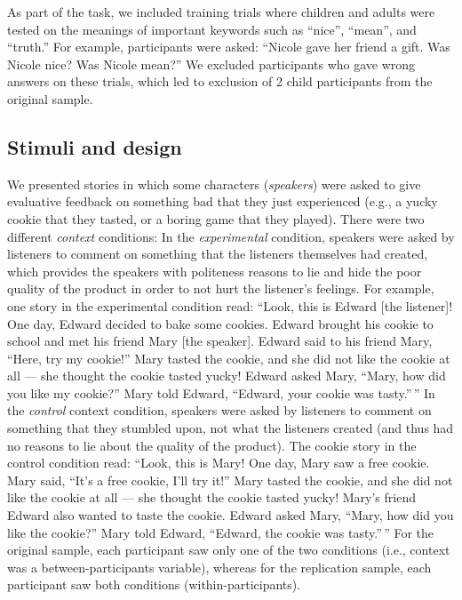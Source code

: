 \documentclass[oneside]{report}
\begin{document}
As part of the task, we included training trials where children and
adults were tested on the meanings of important keywords such as
``nice'', ``mean'', and ``truth.'' For example, participants were asked:
``Nicole gave her friend a gift. Was Nicole nice? Was Nicole mean?'' We
excluded participants who gave wrong answers on these trials, which led
to exclusion of 2 child participants from the original sample.

\subsection{Stimuli and design}\label{stimuli-and-design-2}

We presented stories in which some characters (\emph{speakers}) were
asked to give evaluative feedback on something bad that they just
experienced (e.g., a yucky cookie that they tasted, or a boring game
that they played). There were two different \emph{context} conditions:
In the \emph{experimental} condition, speakers were asked by listeners
to comment on something that the listeners themselves had created, which
provides the speakers with politeness reasons to lie and hide the poor
quality of the product in order to not hurt the listener's feelings. For
example, one story in the experimental condition read: ``Look, this is
Edward {[}the listener{]}! One day, Edward decided to bake some cookies.
Edward brought his cookie to school and met his friend Mary {[}the
speaker{]}. Edward said to his friend Mary, ``Here, try my cookie!''
Mary tasted the cookie, and she did not like the cookie at all --- she
thought the cookie tasted yucky! Edward asked Mary, ``Mary, how did you
like my cookie?'' Mary told Edward, ``Edward, your cookie was
tasty.''\,'' In the \emph{control} context condition, speakers were
asked by listeners to comment on something that they stumbled upon, not
what the listeners created (and thus had no reasons to lie about the
quality of the product). The cookie story in the control condition read:
``Look, this is Mary! One day, Mary saw a free cookie. Mary said, ``It's
a free cookie, I'll try it!'' Mary tasted the cookie, and she did not
like the cookie at all --- she thought the cookie tasted yucky! Mary's
friend Edward also wanted to taste the cookie. Edward asked Mary,
``Mary, how did you like the cookie?'' Mary told Edward, ``Edward, the
cookie was tasty.''\,'' For the original sample, each participant saw
only one of the two conditions (i.e., context was a between-participants
variable), whereas for the replication sample, each participant saw both
conditions (within-participants).
\end{document}
